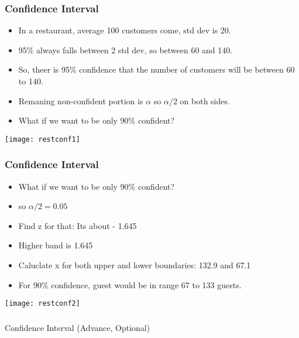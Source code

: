 \begin{frame}[fragile]\frametitle{Confidence Interval}
\begin{itemize}
\item In a restaurant, average 100 customers come, std dev is 20.
\item 95\% always falls between 2 std dev, so between 60 and 140.
\item So, theer is 95\% confidence that the number of customers will be between 60 to 140.
\item Remaning non-confident portion is $\alpha$ so $\alpha/2$ on both sides.
\item What if we want to be only 90\% confident?
\end{itemize}
\begin{center}
\texttt{[image: restconf1]}
\end{center}
\end{frame}

\begin{frame}[fragile]\frametitle{Confidence Interval}
\begin{itemize}
\item What if we want to be only 90\% confident?
\item so $\alpha/2 = 0.05$
\item Find z for that: Its about - 1.645
\item Higher band is 1.645
\item Caluclate x for both upper and lower boundaries: 132.9 and 67.1
\item For 90\% confidence, guest would be in range 67 to 133 guests.
\end{itemize}
\begin{center}
\texttt{[image: restconf2]}
\end{center}
\end{frame}


\begin{frame}[fragile]\frametitle{}
\begin{center}
{\Large Confidence Interval (Advance, Optional)}
\end{center}
\end{frame}

